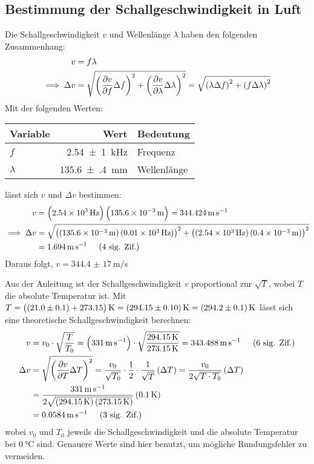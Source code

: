 	\subsection{Bestimmung der Schallgeschwindigkeit in Luft}
		Die Schallgeschwindigkeit $v$ und Wellenlänge $\lambda$ haben den folgenden Zusammenhang:
		\begin{align}
			v &= f\lambda \\
			\implies \Delta v &= \gausserror{v}{f, \lambda} = \sqrt{\pbrace{\lambda\Delta f}^2 + \pbrace{f\Delta \lambda}^2}
		\end{align}
		Mit der folgenden Werten:
	    \begin{center}
	        \begin{tabular}{lrl}
	            \toprule
	            Variable & Wert & Bedeutung \\
	            \midrule
	            $f$ & \SI{2,54(1)}{\kilo\hertz} & Frequenz \\
	            $\lambda$ & \SI{135.6(4)}{\milli\meter} & Wellenlänge \\
	            \bottomrule
	        \end{tabular}
	    \end{center}
	    lässt sich $v$ und $\Delta v$ bestimmen:
	    \begin{align}
			v &= \pbrace{\SI{2,54e3}{\hertz}}\pbrace{\SI{135,6e-3}{\meter}} = \SI{344,424}{\meter\per\second} \\
			\implies \Delta v &= \sqrt{\pbrace{\pbrace{\SI{135,6e-3}{\meter}}\pbrace{\SI{0,01e3}{\hertz}}}^2 + \pbrace{\pbrace{\SI{2,54e3}{\hertz}} \pbrace{\SI{0,4e-3}{\meter}}}^2} \notag \\ 
			&=  \SI{1,694}{\meter\per\second} \sigfig{4}
		\end{align}
		Daraus folgt, $v = \SI{344,4(17)}{\meter\per\second}$

		Aus der Anleitung ist der Schallgeschwindigkeit $v$ proportional zur $\sqrt{T}$, wobei $T$ die absolute Temperatur ist. Mit $T = \pbrace{\pbrace{\num{21,0(1)}} + 273.15} \si{\kelvin} = \SI{294.15(10)}{\kelvin} = \SI{294.2(1)}{\kelvin}$ lässt sich eine theoretische Schallgeschwindigkeit berechnen:
		\begin{align}
			v &= v_0\cdot\sqrt{\frac{T}{T_0}} = \pbrace{\SI{331}{\meter\per\second}}\cdot\sqrt{\frac{\SI{294,15}{\kelvin}}{\SI{273,15}{\kelvin}}} = \SI{343,488}{\meter\per\second} \sigfig{6} \\
			\Delta v &= \gausserror{v}{T} = \frac{v_0}{\sqrt{T_0}}\cdot\frac{1}{2}\cdot\frac{1}{\sqrt{T}}\pbrace{\Delta T} = \frac{v_0}{2\sqrt{T\cdot T_0}} \pbrace{\Delta T} \notag \\
			&= \frac{\SI{331}{\meter\per\second}}{2\sqrt{\pbrace{\SI{294,15}{\kelvin}}\pbrace{\SI{273,15}{\kelvin}}}} \pbrace{\SI{0,1}{\kelvin}} \notag \\
			&= \SI{0,0584}{\meter\per\second} \sigfig{3}
		\end{align}
		wobei $v_0$ und $T_0$ jeweils die Schallgeschwindigkeit und die absolute Temperatur bei $\SI{0}{\celsius}$ sind. Genauere Werte sind hier benutzt, um mögliche Rundungsfehler zu vermeiden. 

